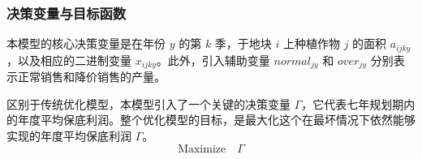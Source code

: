 \vspace{1cm}

\subsubsection{决策变量与目标函数}
本模型的核心决策变量是在年份 $y$ 的第 $k$ 季，于地块 $i$ 上种植作物 $j$ 的面积 $a_{ijky}$，以及相应的二进制变量 $x_{ijky}$。此外，引入辅助变量 $normal_{jy}$ 和 $over_{jy}$ 分别表示正常销售和降价销售的产量。

区别于传统优化模型，本模型引入了一个关键的决策变量 $\Gamma$，它代表七年规划期内的年度平均保底利润。整个优化模型的目标，是最大化这个在最坏情况下依然能够实现的年度平均保底利润 $\Gamma$。
\begin{equation}
	\text{Maximize} \quad \Gamma \label{eq:objective}
\end{equation}

\vspace{1cm}

